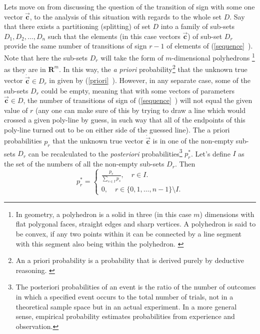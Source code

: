 \documentclass[11pt,a4paper]{article}
\numberwithin{equation}{subsection}
\newcommand{\vecc}{\vec{\textbf{c}}}
\begin{document}
Lets move on from discussing the question of the transition of sign with some one vector $\vecc$, to the analysis of this situation with regards to the whole set $D$. Say that there exists a partitioning (splitting) of set $D$ into a family of sub-sets $D_{1},D_{2},\dots,D_{n}$ such that the elements (in this case vectors $\vecc$) of sub-set $D_{r}$ provide the same number  of transitions of sign $r-1$ of elements of (\vref{sequence}~). Note that here the sub-sets $D_{r}$ will take the form of $m$-dimensional polyhedrons \footnote{In geometry, a polyhedron is a solid in three (in this case $m$) dimensions with flat polygonal faces, straight edges and sharp vertices. A polyhedron is said to be convex, if any two points within it can be connected by a line segment with this segment also being within the polyhedron. \cite{cromwell_1999}} as they are in $\boldsymbol{R}^{m}$. In this way, the \textit{a priori} probability\footnote{An a priori probability is a probability that is derived purely by deductive reasoning. \cite{mood_graybill_boes_1974}} that the unknown true vector $\dot{\vecc} \in D_{r}$ in given by (\vref{priori}~). However, in any separate case, some of the sub-sets $D_{r}$ could be empty, meaning  that with some vectors of parameters $\vecc \in D$, the number of transitions of sign of (\vref{sequence}~) will not equal the given value of $r$ (any one can make sure of this by trying to draw a line which would crossed a given poly-line by guess, in such way that all of the endpoints of this poly-line turned out to be on either side of the guessed line). The a priori probabilities $p_{r}$ that the unknown true vector $\dot{\vecc}$ is in one of the non-empty sub-sets $D_{r}$ can be recalculated to the \textit{posteriori} probabilities\footnote{The posteriori probabilities of an event is the ratio of the number of outcomes in which a specified event occurs to the total number of trials, not in a theoretical sample space but in an actual experiment. In a more general sense, empirical probability estimates probabilities from experience and observation.\cite{mood_graybill_boes_1974}} $p_{r}^{*}$. Let's define $I$ as the set of the numbers of all the non-empty sub-sets $D_{r}$. Then
\begin{equation}
p_{r}^{*}= 
\begin{cases} 
		\frac{p_{r}}{\sum\limits_{s \in I}p_{s}}, \quad r \in I.\\
		0, \quad r \in \{ 0,1,\dots,n-1 \} \setminus I.
\end{cases} \label{posteriori}
\end{equation}
\end{document}
